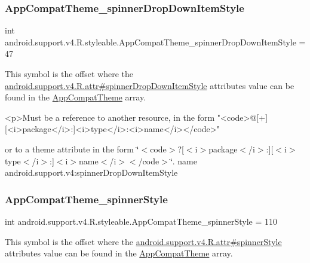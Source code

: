 \subsubsection{\texorpdfstring{App\+Compat\+Theme\+\_\+spinner\+Drop\+Down\+Item\+Style}{AppCompatTheme\_spinnerDropDownItemStyle}}
{\footnotesize\ttfamily int android.\+support.\+v4.\+R.\+styleable.\+App\+Compat\+Theme\+\_\+spinner\+Drop\+Down\+Item\+Style = 47\hspace{0.3cm}{\ttfamily [static]}}

This symbol is the offset where the \hyperlink{classandroid_1_1support_1_1v4_1_1R_1_1attr_aa39c1fbe3c6886d7c6b48dfd88da6591}{android.\+support.\+v4.\+R.\+attr\#spinner\+Drop\+Down\+Item\+Style} attribute\textquotesingle{}s value can be found in the \hyperlink{classandroid_1_1support_1_1v4_1_1R_1_1styleable_ac07ebbe62ed977f6dcaadc6397840ace}{App\+Compat\+Theme} array.

\begin{DoxyVerb}      <p>Must be a reference to another resource, in the form "<code>@[+][<i>package</i>:]<i>type</i>:<i>name</i></code>"
\end{DoxyVerb}
 or to a theme attribute in the form \char`\"{}$<$code$>$?\mbox{[}$<$i$>$package$<$/i$>$\+:\mbox{]}\mbox{[}$<$i$>$type$<$/i$>$\+:\mbox{]}$<$i$>$name$<$/i$>$$<$/code$>$\char`\"{}.  name android.\+support.\+v4\+:spinner\+Drop\+Down\+Item\+Style \mbox{\label{classandroid_1_1support_1_1v4_1_1R_1_1styleable_aeba225a2c69936da0d94609f5e139e48}} 
\subsubsection{\texorpdfstring{App\+Compat\+Theme\+\_\+spinner\+Style}{AppCompatTheme\_spinnerStyle}}
{\footnotesize\ttfamily int android.\+support.\+v4.\+R.\+styleable.\+App\+Compat\+Theme\+\_\+spinner\+Style = 110\hspace{0.3cm}{\ttfamily [static]}}

This symbol is the offset where the \hyperlink{classandroid_1_1support_1_1v4_1_1R_1_1attr_ad20f2744efe2d759417593eaadb38d74}{android.\+support.\+v4.\+R.\+attr\#spinner\+Style} attribute\textquotesingle{}s value can be found in the \hyperlink{classandroid_1_1support_1_1v4_1_1R_1_1styleable_ac07ebbe62ed977f6dcaadc6397840ace}{App\+Compat\+Theme} array.


